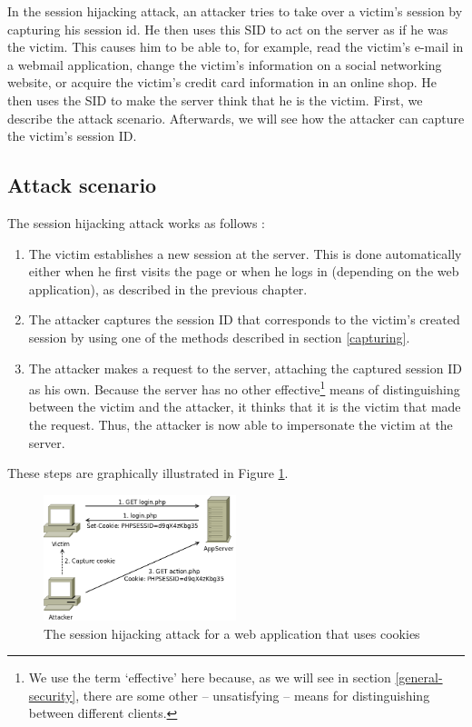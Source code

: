 In the session hijacking attack, an attacker tries to take over a victim's session by capturing his \gls{session id}. He then uses this SID to act on the server as if he was the victim. This causes him to be able to, for example, read the victim's e-mail in a webmail application, change the victim's information on a social networking website, or acquire the victim's credit card information in an online shop.
He then uses the SID to make the server think that he is the victim.  First, we describe the attack scenario. Afterwards, we will see how the attacker can capture the victim's session ID.

\subsection{Attack scenario}

The session hijacking attack works as follows \cite{Nikiforakis2010}:

\begin{enumerate}
	\item The victim establishes a new session at the server. This is done automatically either when he first visits the page or when he logs in (depending on the web application), as described in the previous chapter.
	\item The attacker captures the session ID that corresponds to the victim's created session by using one of the methods described in section \ref{capturing}.
	\item The attacker makes a request to the server, attaching the captured session ID as his own. Because the server has no other effective\footnote{We use the term `effective' here because, as we will see in section \ref{general-security}, there are some other -- unsatisfying -- means for distinguishing between different clients.} means of distinguishing between the victim and the attacker, it thinks that it is the victim that made the request. Thus, the attacker is now able to impersonate the victim at the server.
\end{enumerate}

These steps are graphically illustrated in Figure \ref{fig:hijacking}.

\begin{figure}[htb]
	\centering
	\includegraphics[width=0.50\textwidth]{img/hijacking.png}
	\caption[The session hijacking attack]{The session hijacking attack for a web application that uses cookies}
	\label{fig:hijacking}
\end{figure}

